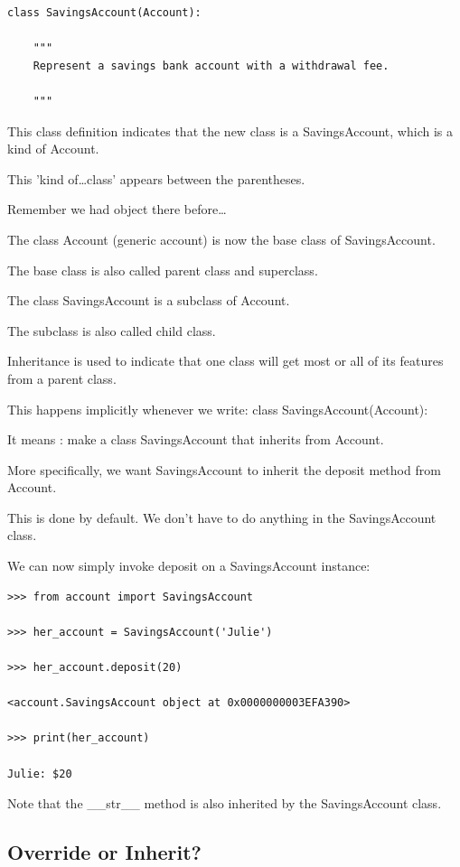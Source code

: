 \documentclass{article}
\begin{document}
\begin{lstlisting}
class SavingsAccount(Account):
 
    """
    Represent a savings bank account with a withdrawal fee.
 
    """
\end{lstlisting}

This class definition indicates that the new class is a SavingsAccount, which is a kind of Account.

This 'kind of…class' appears between the parentheses. 

Remember we had object there  before…

The class Account (generic account) is now the base class of SavingsAccount.

The base class is also called parent class and superclass.

The class SavingsAccount is a subclass of Account. 

The subclass is also called child class.

Inheritance is used to indicate that one class will get most or all of its features from a parent class.

This happens implicitly whenever we write: class SavingsAccount(Account):

It means : make a class SavingsAccount that inherits from Account. 

More specifically, we want SavingsAccount to inherit the deposit method from Account.

This is done by default.  We don’t have to do anything in the SavingsAccount class.

We can now simply invoke deposit on a SavingsAccount instance:

\begin{lstlisting}
>>> from account import SavingsAccount

>>> her_account = SavingsAccount('Julie')

>>> her_account.deposit(20)

<account.SavingsAccount object at 0x0000000003EFA390>

>>> print(her_account)

Julie: $20
\end{lstlisting}

Note that the {\_}{\_}str{\_}{\_} method is also inherited by the SavingsAccount class.

\subsection{Override or Inherit?}
\end{document}
